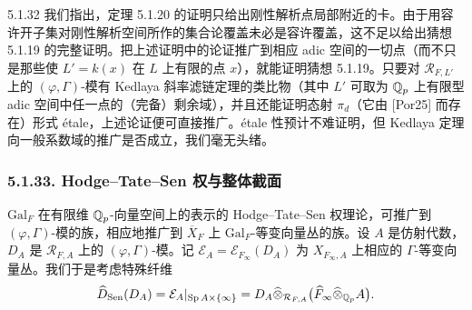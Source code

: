 \begin{rem}{5.1.32}\label{rem:a4-5-1-32}
我们指出，定理 5.1.20 的证明只给出刚性解析点局部附近的卡。由于用容许开子集对刚性解析空间所作的集合论覆盖未必是容许覆盖，这不足以给出猜想 5.1.19 的完整证明。把上述证明中的论证推广到相应 adic 空间的一切点（而不只是那些使 $L'=k(x)$ 在 $L$ 上有限的点 $x$），就能证明猜想 5.1.19。只要对 $\mathcal{R}_{F,L'}$ 上的 $(\varphi,\Gamma)$-模有 Kedlaya 斜率滤链定理的类比物（其中 $L'$ 可取为 $\mathbb{Q}_p$ 上有限型 adic 空间中任一点的（完备）剩余域），并且还能证明态射 $\pi_d$（它由 [Por25] 而存在）形式 étale，上述论证便可直接推广。étale 性预计不难证明，但 Kedlaya 定理向一般系数域的推广是否成立，我们毫无头绪。
\end{rem}

\subsubsection*{5.1.33. Hodge--Tate--Sen 权与整体截面}
$\mathrm{Gal}_F$ 在有限维 $\mathbb{Q}_p$-向量空间上的表示的 Hodge--Tate--Sen 权理论，可推广到 $(\varphi,\Gamma)$-模的族，相应地推广到 $\overline{X}_F$ 上 $\mathrm{Gal}_F$-等变向量丛的族。设 $A$ 是仿射代数，$D_A$ 是 $\mathcal{R}_{F,A}$ 上的 $(\varphi,\Gamma)$-模。记 $\mathcal{E}_A=\mathcal{E}_{F_\infty}(D_A)$ 为 $X_{F_\infty,A}$ 上相应的 $\Gamma$-等变向量丛。我们于是考虑特殊纤维
\[
\widehat{D}_{\mathrm{Sen}}(D_A)=\mathcal{E}_A|_{\operatorname{Sp} A\times\{\infty\}}=D_A\widehat{\otimes}_{\mathcal{R}_{F,A}}\bigl(\widehat{F}_\infty\widehat{\otimes}_{\mathbb{Q}_p}A\bigr).
\]

